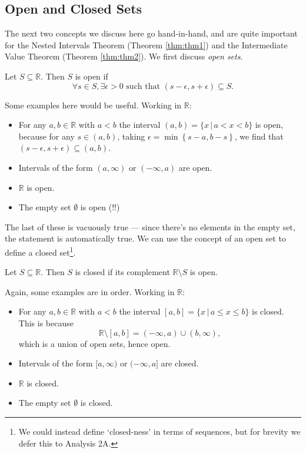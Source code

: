 \documentclass[
  17pt,
  a4paper]{extarticle}
\providecommand{\tightlist}{%
  \setlength{\itemsep}{0pt}\setlength{\parskip}{0pt}}
\theoremstyle{plain}
\theoremstyle{plain}
\theoremstyle{plain}
\theoremstyle{plain}
\theoremstyle{plain}
\theoremstyle{definition}
\theoremstyle{definition}
\theoremstyle{definition}
\theoremstyle{remark}
\let\BeginKnitrBlock\begin \let\EndKnitrBlock\end
\renewcommand{\;}{\,}
\begin{document}
\hypertarget{open-and-closed-sets}{%
\subsection{Open and Closed Sets}\label{open-and-closed-sets}}

The next two concepts we discuss here go hand-in-hand, and are quite important for the Nested Intervals Theorem (Theorem \ref{thm:thm1}) and the Intermediate Value Theorem (Theorem \ref{thm:thm2}). We first discuss \emph{open sets}.

\BeginKnitrBlock{definition}[Open Set]
{\label{def:def4} }Let \(S \subseteq \mathbb{R}\). Then \(S\) is open if \[\forall s \in S, \exists \epsilon > 0 \;\; \text{such that} \;\; (s-\epsilon,s+\epsilon) \subseteq S.\]
\EndKnitrBlock{definition}
Some examples here would be useful. Working in \(\mathbb{R}\):

\begin{itemize}
\tightlist
\item
  For any \(a,b \in \mathbb{R}\) with \(a < b\) the interval \((a,b) = \lbrace x \;\lvert\; a < x < b \rbrace\) is open, because for any \(s \in (a,b)\), taking \(\epsilon = \min\left\lbrace s-a, b-s\right\rbrace\), we find that \((s-\epsilon, s + \epsilon) \subseteq (a,b)\).
\item
  Intervals of the form \((a, \infty)\) or \((-\infty, a)\) are open.
\item
  \(\mathbb{R}\) is open.
\item
  The empty set \(\emptyset\) is open (!!)
\end{itemize}

The last of these is vacuously true --- since there's no elements in the empty set, the statement is automatically true. We can use the concept of an open set to define a closed set\footnote{We could instead define `closed-ness' in terms of sequences, but for brevity we defer this to Analysis 2A.}.

\BeginKnitrBlock{definition}[Closed Set]
{\label{def:def5} }Let \(S \subseteq \mathbb{R}\). Then \(S\) is closed if its complement \(\mathbb{R}\setminus S\) is open.
\EndKnitrBlock{definition}
Again, some examples are in order. Working in \(\mathbb{R}\):

\begin{itemize}
\tightlist
\item
  For any \(a,b \in \mathbb{R}\) with \(a < b\) the interval \([a,b] = \lbrace x \;\lvert\; a \leq x \leq b \rbrace\) is closed. This is because \[\mathbb{R}\setminus[a,b] = (-\infty,a)\cup(b,\infty),\] which is a union of open sets, hence open.
\item
  Intervals of the form \([a, \infty)\) or \((-\infty, a]\) are closed.
\item
  \(\mathbb{R}\) is closed.
\item
  The empty set \(\emptyset\) is closed.
\end{itemize}
\end{document}
